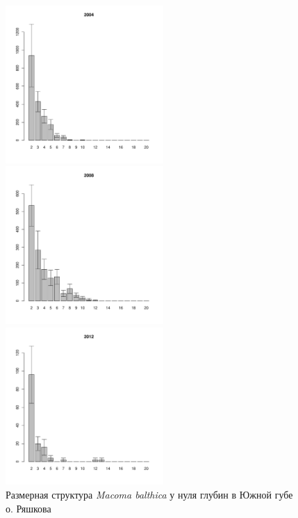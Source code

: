 \begin{figure}[hp]
	\begin{minipage}[b]{.3\linewidth}
	\begin{center}
	\includegraphics[width=60mm]{../White_Sea/Ryashkov_YuG/YuG2_2004_.pdf}
	\end{center}
	\end{minipage}
	\hfill
	\begin{minipage}[b]{.3\linewidth}
	\begin{center}
	\includegraphics[width=60mm]{../White_Sea/Ryashkov_YuG/YuG2_2008_.pdf}
	\end{center}
	\end{minipage}
	\hfill
	\begin{minipage}[b]{.3\linewidth}
	\begin{center}
	\includegraphics[width=60mm]{../White_Sea/Ryashkov_YuG/YuG2_2012_.pdf}
	\end{center}
	\end{minipage}
\caption{Размерная структура {\it Macoma balthica} у нуля глубин в Южной губе о. Ряшкова}
\label{ris:size_str_YuG}
\end{figure}



